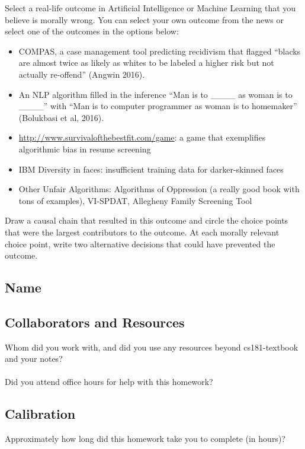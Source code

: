 \documentclass[submit]{harvardml}
\begin{document}
\newpage

\begin{problem}

Select a real-life outcome in Artificial Intelligence or Machine Learning 
that you believe is morally wrong. You can select your own outcome from 
the news or select one of the outcomes in the options below:

\begin{itemize}
    \item COMPAS, a case management tool predicting recidivism that 
        flagged “blacks are almost twice as likely as whites to be 
        labeled a higher risk but not actually re-offend” (Angwin 
        2016).
        
    \item An NLP algorithm filled in the inference “Man is to 
        \_\_\_\_ as woman is to \_\_\_\_” with “Man is 
        to computer programmer as woman is to homemaker” (Bolukbasi 
        et al, 2016).
        
    \item \url{http://www.survivalofthebestfit.com/game}: a game that 
        exemplifies algorithmic bias in resume screening
        
    \item IBM Diversity in faces: insufficient training data for 
        darker-skinned faces
        
    \item Other Unfair Algorithms: Algorithms of Oppression (a really 
        good book with tons of examples), VI-SPDAT, Allegheny Family 
        Screening Tool
        
\end{itemize}
Draw a causal chain that resulted in this outcome and circle the choice points that were the largest contributors to the outcome. At each morally relevant choice point, write two alternative decisions that could have prevented the outcome.

\end{problem}

\newpage
\subsection*{Name}
\subsection*{Collaborators and Resources}
Whom did you work with, and did you use any resources beyond cs181-textbook and your notes?\\
\\
Did you attend office hours for help with this homework?

\subsection*{Calibration}
Approximately how long did this homework take you to complete (in hours)? 
\end{document}
